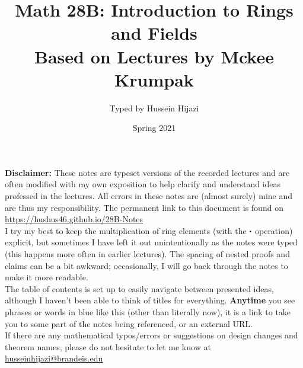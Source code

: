 \documentclass[../Main.tex]{subfiles}
\begin{document}
\title{\textbf {Math 28B: Introduction to Rings and Fields}\\[0.2em]\large Based on Lectures by Mckee Krumpak\vspace{-2ex} }
\author{Typed by Hussein Hijazi}
\date{Spring 2021}
\begin{minipage}{\textwidth}
\maketitle
\textbf{Disclaimer:} These notes are typeset versions of the recorded lectures and are often modified with my own exposition to help clarify and understand ideas professed in the lectures. All errors in these notes are (almost surely) mine and are thus my responsibility. The permanent link to this document is found on \href{https://hushus46.github.io/28B-Notes/}{https://hushus46.github.io/28B-Notes}\\

I try my best to keep the multiplication of ring elements (with the $\rdot $ operation) explicit, but sometimes I have left it out unintentionally as the notes were typed (this happens more often in earlier lectures). The spacing of nested proofs and claims can be a bit awkward; occasionally, I will go back through the notes to make it more readable.\\

The table of contents is set up to easily navigate between presented ideas, although I haven't been able to think of titles for everything. \textbf{Anytime} you see phrases or words in {\color{blue}blue like this} (other than literally now), it is a link to take you to some part of the notes being referenced, or an external URL.\\

If there are any mathematical typos/errors or suggestions on design changes and theorem names, please do not hesitate to let me know at \href{mailto:husseinhijazi@brandeis.edu}{husseinhijazi@brandeis.edu}
\end{minipage}
\end{document}
